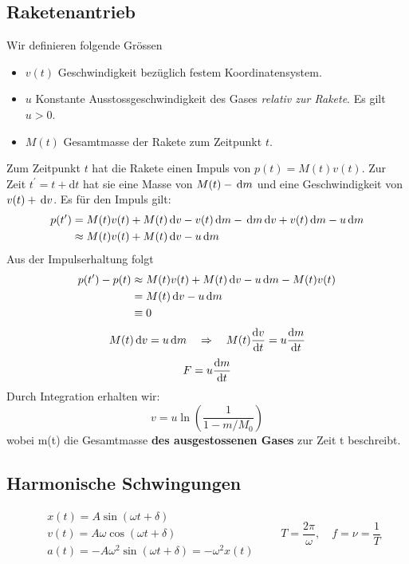 \subsection{Raketenantrieb}
Wir definieren folgende Grössen
\begin{itemize}
\item $v(t)$ Geschwindigkeit bezüglich festem Koordinatensystem.
\item $u$ Konstante Ausstossgeschwindigkeit des Gases \textit{relativ zur Rakete}. Es gilt $u > 0$.
\item $M(t)$ Gesamtmasse der Rakete zum Zeitpunkt $t$.
\end{itemize}
Zum Zeitpunkt $t$ hat die Rakete einen Impuls von $p(t) = M(t)v(t)$. Zur Zeit $t^\prime = t + \mathrm{d}t$ hat sie eine Masse von $M(t) - \,\mathrm{d} m$ und eine Geschwindigkeit von $v(t) + \,\mathrm{d} v$. Es für den Impuls gilt:
\begin{equation}
\begin{split}
p(t^\prime) &= M(t)v(t) + M(t)\,\mathrm{d} v - v(t) \,\mathrm{d} m - \,\mathrm{d} m \,\mathrm{d} v + v(t) \,\mathrm{d} m - u \,\mathrm{d} m \\
	 &\approx  M(t)v(t) + M(t)\,\mathrm{d} v - u \,\mathrm{d} m 
\end{split}
\end{equation}
Aus der Impulserhaltung folgt
\begin{equation}
\begin{split}
p(t^\prime) - p(t)	& \approx M(t)v(t) + M(t)\,\mathrm{d} v - u \,\mathrm{d} m - M(t)v(t) \\
					& = M(t)\,\mathrm{d} v - u \,\mathrm{d} m \\
					& \equiv 0
\end{split}
\end{equation}
\begin{equation}
M(t) \,\mathrm{d} v = u \,\mathrm{d} m \quad\Rightarrow\quad M(t) \frac{\mathrm d v}{\mathrm d t} = u \frac{\mathrm d m}{\mathrm d t}
\end{equation}
\begin{equation}
F = u \frac{\mathrm d m}{\mathrm d t}
\end{equation}
Durch Integration erhalten wir:
\begin{equation}
v = u \ln \left(\dfrac{1}{1 - m/M_0} \right)
\end{equation}
wobei m(t) die Gesamtmasse \textbf{des ausgestossenen Gases} zur Zeit t beschreibt.
\subsection{Harmonische Schwingungen}
\begin{equation}
\begin{aligned}
&x(t) = A \sin \left( \omega t + \delta \right) \\
&v(t) = A \omega \cos \left( \omega t + \delta \right) \\
&a(t) = -A \omega ^2 \sin \left( \omega t + \delta \right) = - \omega ^2 x(t)
\end{aligned} \qquad
T = \dfrac{2 \pi}{\omega}, \quad f = \nu = \dfrac{1}{T}
\end{equation}
